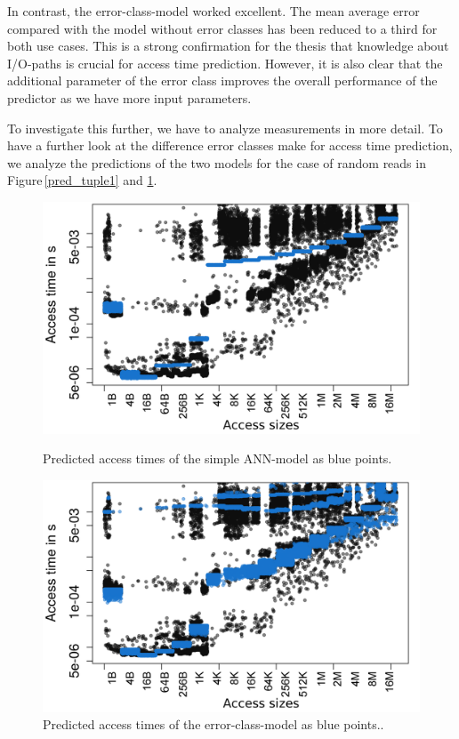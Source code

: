\documentclass{superfri}
\begin{document}
In contrast, the error-class-model worked excellent. The mean average error compared with the model without error classes has been reduced to a third for both use cases.
This is a strong confirmation for the thesis that knowledge about I/O-paths is crucial for access time prediction.
However, it is also clear that the additional parameter of the error class improves the overall performance of the predictor as we have more input parameters. 

\medskip

To investigate this further, we have to analyze measurements in more detail.
To have a further look at the difference error classes make for access time prediction, we analyze the predictions of the two models for the case of random reads in Figure\,\ref{pred_tuple1} and \ref{pred_error}.
\begin{figure}[!h]
	\centering
	\begin{minipage}[b]{0.47\textwidth}
		\includegraphics[width=\textwidth]{src/plot_onlyPred_tuple1_Duration_rnd.png}
		\caption{Predicted access times of the simple ANN-model as blue points.}
		\label{pred_tuple1}
	\end{minipage}
	\hfill
	\begin{minipage}[b]{0.47\textwidth}
		\includegraphics[width=\textwidth]{src/plot_onlyPred_tuple1_with_error_class_from_linreg_Duration_rnd.png}
		\caption{Predicted access times of the error-class-model as blue points..}
		\label{pred_error}
	\end{minipage}
\end{figure}
\end{document}

